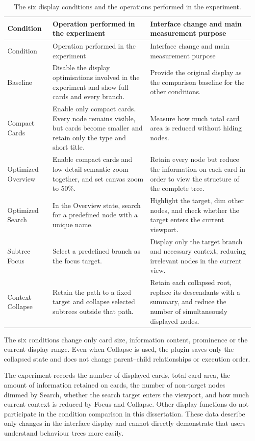 \setlength{\LTcapwidth}{\textwidth}
\begin{longtable}{p{}p{}p{}}
\caption{The six display conditions and the operations performed in the experiment.}\label{tab:displayconditions}\\
\toprule Condition & Operation performed in the experiment & Interface change and main measurement purpose \\ \midrule\endfirsthead
\toprule Condition & Operation performed in the experiment & Interface change and main measurement purpose \\ \midrule\endhead
Baseline & Disable the display optimisations involved in the experiment and show full cards and every branch. & Provide the original display as the comparison baseline for the other conditions.\\
Compact Cards & Enable only compact cards. Every node remains visible, but cards become smaller and retain only the type and short title. & Measure how much total card area is reduced without hiding nodes.\\
Optimized Overview & Enable compact cards and low-detail semantic zoom together, and set canvas zoom to 50\%. & Retain every node but reduce the information on each card in order to view the structure of the complete tree.\\
Optimized Search & In the Overview state, search for a predefined node with a unique name. & Highlight the target, dim other nodes, and check whether the target enters the current viewport.\\
Subtree Focus & Select a predefined branch as the focus target. & Display only the target branch and necessary context, reducing irrelevant nodes in the current view.\\
Context Collapse & Retain the path to a fixed target and collapse selected subtrees outside that path. & Retain each collapsed root, replace its descendants with a summary, and reduce the number of simultaneously displayed nodes.\\
\bottomrule
\end{longtable}

The six conditions change only card size, information content, prominence or the current display range. Even when Collapse is used, the plugin saves only the collapsed state and does not change parent--child relationships or execution order.

The experiment records the number of displayed cards, total card area, the amount of information retained on cards, the number of non-target nodes dimmed by Search, whether the search target enters the viewport, and how much current context is reduced by Focus and Collapse. Other display functions do not participate in the condition comparison in this dissertation. These data describe only changes in the interface display and cannot directly demonstrate that users understand behaviour trees more easily.

